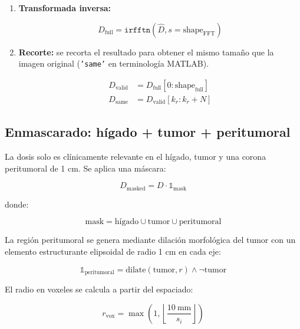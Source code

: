 \documentclass[12pt,a4paper]{article}
\begin{document}
\begin{enumerate}
    \item \textbf{Transformada inversa:}

        \begin{equation}
            D_{\text{full}} = \texttt{irfftn}(\hat{D}, s=\text{shape}_{\text{FFT}})
        \end{equation}

    \item \textbf{Recorte:} se recorta el resultado para obtener el mismo
        tamaño que la imagen original (\texttt{'same'} en terminología
        MATLAB).

        \begin{align}
            D_{\text{valid}} &= D_{\text{full}}[0:\text{shape}_{\text{full}}] \\
            D_{\text{same}} &= D_{\text{valid}}[k_r : k_r + N]
        \end{align}
\end{enumerate}

\subsection{Enmascarado: hígado + tumor + peritumoral}

La dosis solo es clínicamente relevante en el hígado, tumor y una corona
peritumoral de 1 cm. Se aplica una máscara:

\begin{equation}
    D_{\text{masked}} = D \cdot \mathbb{1}_{\text{mask}}
\end{equation}

donde:

\begin{equation}
    \text{mask} = \text{hígado} \cup \text{tumor} \cup \text{peritumoral}
\end{equation}

La región peritumoral se genera mediante dilación morfológica del tumor
con un elemento estructurante elipsoidal de radio 1 cm en cada eje:

\begin{equation}
    \mathbb{1}_{\text{peritumoral}} = \text{dilate}(\text{tumor}, r) \land \lnot \text{tumor}
\end{equation}

El radio en voxeles se calcula a partir del espaciado:

\begin{equation}
    r_{\text{vox}} = \max\left(1, \left\lfloor \frac{10\ \text{mm}}{s_i} \right\rfloor\right)
\end{equation}
\end{document}
